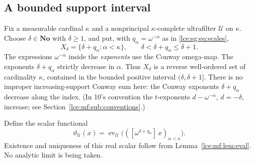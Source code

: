 \documentclass[11pt,letterpaper]{article}
\numberwithin{equation}{section}
\theoremstyle{definition}
\theoremstyle{remark}
\newcommand{\No}{\mathbf{No}}
\newcommand{\coef}[2]{[\omega^{#1}]\,#2}
\newcommand{\leref}[1]{Lemma~\ref{#1}}
\newcommand{\ev}{\operatorname{ev}}
\begin{document}
\subsection{A bounded support interval}
Fix a measurable cardinal $\kappa$ and a nonprincipal $\kappa$-complete
ultrafilter $\mathcal U$ on $\kappa$. Choose $\delta\in\No$ with
$\delta\ge1$, and put, with $q_\alpha=\omega^{-\alpha}$ as in
\eqref{lce:sg:eq:scales},
\begin{equation}\label{lce:mf:eq:detectorsupport}
 X_\delta=\{\delta+q_\alpha:\alpha<\kappa\},\qquad
 \delta<\delta+q_\alpha\le\delta+1 .
\end{equation}
The expressions $\omega^{-\alpha}$ inside the \emph{exponents} use the
Conway omega-map. The exponents $\delta+q_\alpha$ strictly decrease in
$\alpha$. Thus $X_\delta$ is a reverse well-ordered set of cardinality
$\kappa$, contained in the bounded positive interval $(\delta,\delta+1]$.
There is no improper increasing-support Conway sum here: the Conway
exponents $\delta+q_\alpha$ decrease along the index. (In 10's convention
the $t$-exponents $d-\omega^{-\alpha}$, $d=-\delta$, increase; see
Section~\ref{lce:mf:sub:conventions}.)

Define the scalar functional
\begin{equation}\label{lce:mf:eq:detector}
 \vartheta_{\mathcal U}(x)=\ev_{\mathcal U}\bigl((\coef{\delta+q_\alpha}x)_{\alpha<\kappa}\bigr).
\end{equation}
Existence and uniqueness of this real scalar follow from
\leref{lce:mf:lem:eval}. No analytic limit is being taken.
\end{document}
